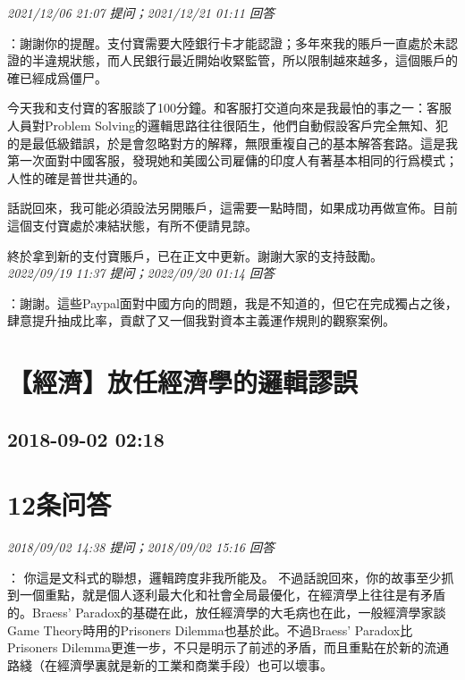 \documentclass[twocolumn]{ctexart}
\begin{document}
\textit{\hfill\noindent\small 2021/12/06 21:07 提问；2021/12/21 01:11 回答}

：謝謝你的提醒。支付寶需要大陸銀行卡才能認證；多年來我的賬戶一直處於未認證的半違規狀態，而人民銀行最近開始收緊監管，所以限制越來越多，這個賬戶的確已經成爲僵尸。

今天我和支付寶的客服談了100分鐘。和客服打交道向來是我最怕的事之一：客服人員對Problem Solving的邏輯思路往往很陌生，他們自動假設客戶完全無知、犯的是最低級錯誤，於是會忽略對方的解釋，無限重複自己的基本解答套路。這是我第一次面對中國客服，發現她和美國公司雇傭的印度人有著基本相同的行爲模式；人性的確是普世共通的。

話説回來，我可能必須設法另開賬戶，這需要一點時間，如果成功再做宣佈。目前這個支付寶處於凍結狀態，有所不便請見諒。


終於拿到新的支付寶賬戶，已在正文中更新。謝謝大家的支持鼓勵。
\\

\textit{\hfill\noindent\small 2022/09/19 11:37 提问；2022/09/20 01:14 回答}

：謝謝。這些Paypal面對中國方向的問題，我是不知道的，但它在完成獨占之後，肆意提升抽成比率，貢獻了又一個我對資本主義運作規則的觀察案例。
\\


\section{【經濟】放任經濟學的邏輯謬誤}
\subsection{2018-09-02 02:18}


\section{12条问答}

\textit{\hfill\noindent\small 2018/09/02 14:38 提问；2018/09/02 15:16 回答}

：
你這是文科式的聯想，邏輯跨度非我所能及。
不過話說回來，你的故事至少抓到一個重點，就是個人逐利最大化和社會全局最優化，在經濟學上往往是有矛盾的。Braess' Paradox的基礎在此，放任經濟學的大毛病也在此，一般經濟學家談Game Theory時用的Prisoners Dilemma也基於此。不過Braess' Paradox比Prisoners Dilemma更進一步，不只是明示了前述的矛盾，而且重點在於新的流通路綫（在經濟學裏就是新的工業和商業手段）也可以壞事。
\\
\end{document}

